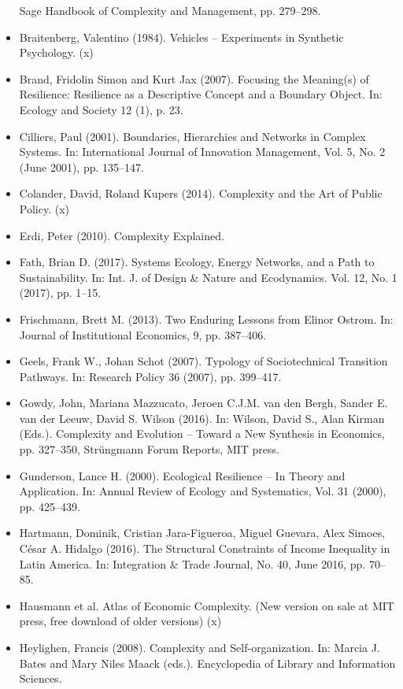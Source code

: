 \documentclass[11pt,a4paper]{article}
\begin{document}
\begin{itemize}
  Sage Handbook of Complexity and Management, pp. 279--298.
\item Braitenberg, Valentino (1984). Vehicles – Experiments in Synthetic
  Psychology.  (x)
\item Brand, Fridolin Simon and Kurt Jax (2007).  Focusing the Meaning(s) of
  Resilience: Resilience as a Descriptive Concept and a Boundary Object. In:
  Ecology and Society 12 (1), p. 23.
\item Cilliers, Paul (2001). Boundaries, Hierarchies and Networks in Complex
  Systems. In: International Journal of Innovation Management, Vol. 5, No. 2
  (June 2001), pp. 135–147.
\item Colander, David, Roland Kupers (2014). Complexity and the Art of Public
  Policy.  (x)
\item Erdi, Peter (2010). Complexity Explained. 
\item Fath, Brian D. (2017). Systems Ecology, Energy Networks, and a Path to
  Sustainability. In: Int. J. of Design \& Nature and Ecodynamics. Vol. 12,
  No. 1 (2017), pp. 1–15. 
\item Frischmann, Brett M. (2013). Two Enduring Lessons from Elinor Ostrom. In:
  Journal of Institutional Economics, 9, pp. 387--406.
\item Geels, Frank W., Johan Schot (2007). Typology of Sociotechnical
  Transition Pathways. In: Research Policy 36 (2007), pp. 399–417.
\item Gowdy, John, Mariana Mazzucato, Jeroen C.J.M. van den Bergh, Sander E.
  van der Leeuw, David S. Wilson (2016). In: Wilson, David S., Alan Kirman
  (Eds.). Complexity and Evolution -- Toward a New Synthesis in Economics,
  pp. 327--350, Strüngmann Forum Reports, MIT press.
\item Gunderson, Lance H. (2000). Ecological Resilience -- In Theory and
  Application. In: Annual Review of Ecology and Systematics, Vol. 31 (2000),
  pp. 425--439. 
\item Hartmann, Dominik, Cristian Jara-Figueroa, Miguel Guevara, Alex Simoes,
  César A. Hidalgo (2016). The Structural Constraints of Income Inequality in
  Latin America. In: Integration \& Trade Journal, No. 40, June 2016,
  pp. 70--85. 
\item Hausmann et al. Atlas of Economic Complexity. (New version on sale at
  MIT press, free download of older versions) (x)
\item Heylighen, Francis (2008). Complexity and Self-organization. In: Marcia
  J. Bates and Mary Niles Maack (eds.). Encyclopedia of Library and
  Information Sciences.

\end{itemize}
\end{document}
